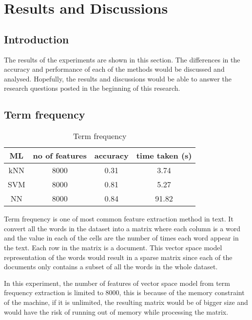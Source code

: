 
\chapter{Results and Discussions}

\section{Introduction}
The results of the experiments are shown in this section. The differences in the accuracy and performance of each of the methods would be discussed and analysed. Hopefully, the results and discussions would be able to answer the research questions posted in the beginning of this research.

\section{Term frequency}

\begin{table}[ht]
	\centering
	\begin{tabular}{|| c | c | c | c||}
		\hline
		ML & no of features & accuracy & time taken (s) \\ [0.5ex]
		\hline\hline
		kNN & 8000 & 0.31 & 3.74 \\ 
		\hline
		SVM & 8000 & 0.81 & 5.27 \\
		\hline
		NN & 8000 & 0.84 & 91.82 \\
		\hline
	\end{tabular}
\caption{Term frequency}
\label{tbl:termFrequency}
\end{table}

Term frequency is one of most common feature extraction method in text. It convert all the words in the dataset into a matrix where each column is a word and the value in each of the cells are the number of times each word appear in the text. Each row in the matrix is a document. This vector space model representation of the words would result in a sparse matrix since each of the documents only contains a subset of all the words in the whole dataset. 

In this experiment, the number of features of vector space model from term frequency extraction is limited to 8000, this is because of the memory constraint of the machine, if it is unlimited, the resulting matrix would be of bigger size and would have the risk of running out of memory while processing the matrix. 

